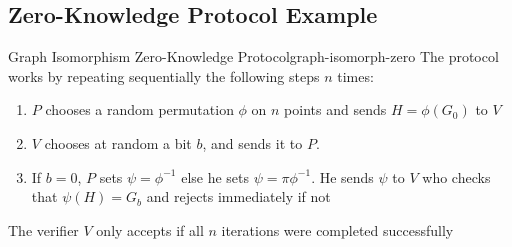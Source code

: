 \subsection{Zero-Knowledge Protocol Example}
\begin{protocol}{Graph Isomorphism Zero-Knowledge Protocol}{graph-isomorph-zero}
  The protocol works by repeating sequentially the following steps $n$ times:
  \begin{enumerate}
  	\item $P$ chooses a random permutation $\phi$ on $n$ points and sends $H=\phi(G_0)$ to $V$
    \item $V$ chooses at random a bit $b$, and sends it to $P$.
    \item If $b=0$, $P$ sets $\psi = \phi^{-1}$ else he sets $\psi = \pi\phi^{-1}$. He sends $\psi$ to $V$ who checks that $\psi(H) = G_b$ and rejects immediately if not
  \end{enumerate}
  The verifier $V$ only accepts if all $n$ iterations were completed successfully
\end{protocol}
